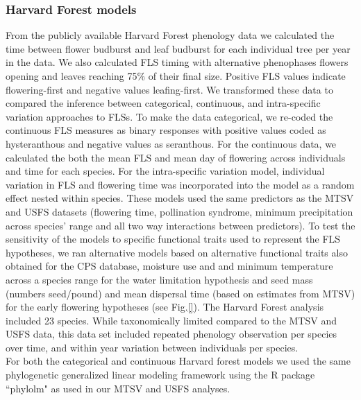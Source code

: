 \documentclass[11pt]{article}\usepackage[]{graphicx}\usepackage[]{color}
\begin{document}
\subsubsection*{Harvard Forest models}
From the publicly available Harvard Forest phenology data \citep{OKeefe2015} we calculated the time between flower budburst and leaf budburst for each individual tree per year in the data. We also calculated FLS timing with alternative phenophases flowers opening and leaves reaching 75\% of their final size. Positive FLS values indicate flowering-first and negative values leafing-first. We transformed these data to compared the inference between categorical, continuous, and intra-specific variation approaches to FLSs. To make the data categorical, we re-coded the continuous FLS measures as binary responses with positive values coded as hysteranthous and negative values as seranthous. For the continuous data, we calculated the both the mean FLS and mean day of flowering across individuals and time for each species. For the intra-specific variation model, individual variation in FLS and flowering time was incorporated into the model as a random effect nested within species. These models used the same predictors as the MTSV and USFS datasets (flowering time, pollination syndrome, minimum precipitation across species' range and all two way interactions between predictors). To test the sensitivity of the models to specific functional traits used to represent the FLS hypotheses, we ran alternative models based on alternative functional traits also obtained for the CPS database\citep{usdancrs}, moisture use and and minimum temperature across a species range for the water limitation hypothesis and seed mass (numbers seed/pound) and mean dispersal time (based on estimates from MTSV) for the early flowering hypotheses (see Fig.\ref{}). The Harvard Forest analysis included 23 species. While taxonomically limited compared to the MTSV and USFS data, this data set included repeated phenology observation per species over time, and within year variation between individuals per species. \\ 
For both the categorical and continuous Harvard forest models we used the same phylogenetic generalized linear modeling framework \citep{Ives2010} using the R package ``phylolm" \citep{Ho2014} as used in our MTSV and USFS analyses.\\
\end{document}
